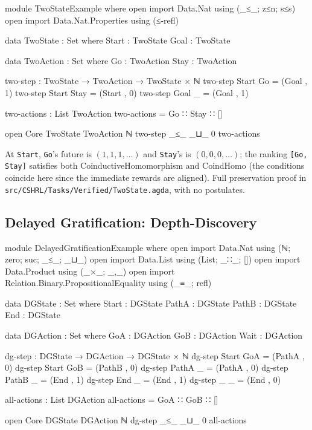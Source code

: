\documentclass[9pt,a4paper]{article}
\newcommand{\fpath}[1]{\nolinkurl{#1}}
\theoremstyle{plain}
\theoremstyle{definition}
\theoremstyle{remark}
\begin{document}
\begin{code}
module TwoStateExample where
  open import Data.Nat using (_≤_; z≤n; s≤s)
  open import Data.Nat.Properties using (≤-refl)

  data TwoState : Set where
    Start : TwoState
    Goal  : TwoState

  data TwoAction : Set where
    Go   : TwoAction
    Stay : TwoAction

  two-step : TwoState → TwoAction → TwoState × ℕ
  two-step Start Go   = (Goal , 1)
  two-step Start Stay = (Start , 0)
  two-step Goal  _    = (Goal , 1)

  two-actions : List TwoAction
  two-actions = Go ∷ Stay ∷ []

  open Core TwoState TwoAction ℕ two-step _≤_ _⊔_ 0 two-actions
\end{code}

\noindent At \texttt{Start}, \texttt{Go}'s future is $(1, 1, 1, \ldots)$ and \texttt{Stay}'s is $(0, 0, 0, \ldots)$; the ranking \texttt{[Go, Stay]} satisfies both CoinductiveHomomorphism and CoindHomo (the conditions coincide here since the immediate rewards are aligned).  Full preservation proof in \fpath{src/CSHRL/Tasks/Verified/TwoState.agda}, with no postulates.

\subsection{Delayed Gratification: Depth-Discovery}

\begin{code}[hide]
module DelayedGratificationExample where
  open import Data.Nat using (ℕ; zero; suc; _≤_; _⊔_)
  open import Data.List using (List; _∷_; [])
  open import Data.Product using (_×_; _,_)
  open import Relation.Binary.PropositionalEquality using (_≡_; refl)
\end{code}
\begin{code}
  data DGState : Set where
    Start : DGState
    PathA : DGState
    PathB : DGState
    End   : DGState

  data DGAction : Set where
    GoA  : DGAction
    GoB  : DGAction
    Wait : DGAction

  dg-step : DGState → DGAction → DGState × ℕ
  dg-step Start GoA = (PathA , 0)
  dg-step Start GoB = (PathB , 0)
  dg-step PathA _   = (PathA , 0)
  dg-step PathB _   = (End , 1)
  dg-step End   _   = (End , 1)
  dg-step _     _   = (End , 0)

  all-actions : List DGAction
  all-actions = GoA ∷ GoB ∷ []

  open Core DGState DGAction ℕ dg-step _≤_ _⊔_ 0 all-actions
\end{code}
\end{document}
